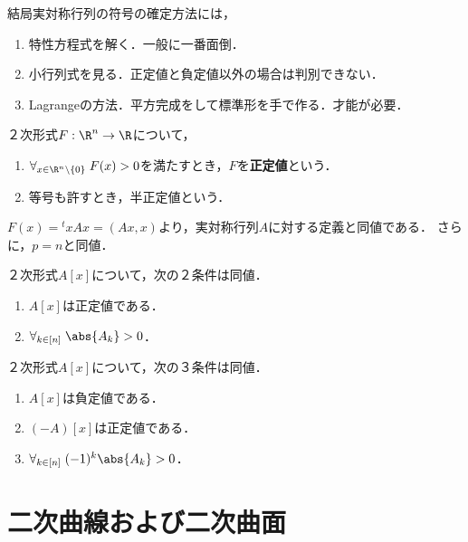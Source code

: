 \documentclass[uplatex, dvipdfmx]{jsreport}
\begin{document}
\begin{tcolorbox}[colframe=ForestGreen, colback=ForestGreen!10!white,breakable,colbacktitle=ForestGreen!40!white,coltitle=black,fonttitle=\bfseries\sffamily,
title=]
    結局実対称行列の符号の確定方法には，
    \begin{enumerate}
        \item 特性方程式を解く．一般に一番面倒．
        \item 小行列式を見る．正定値と負定値以外の場合は判別できない．
        \item Lagrangeの方法．平方完成をして標準形を手で作る．才能が必要．
    \end{enumerate}
\end{tcolorbox}

\begin{definition}
    ２次形式$F:\R^n\to\R$について，
    \begin{enumerate}
        \item $\forall_{x\in\R^n\setminus\{0\}}\;F(x)>0$を満たすとき，$F$を\textbf{正定値}という．
        \item 等号も許すとき，半正定値という．
    \end{enumerate}
    $F(x)={}^t\!xAx=(Ax,x)$より，実対称行列$A$に対する定義と同値である．
    さらに，$p=n$と同値．
\end{definition}

\begin{theorem}[小行列式による正値性判定法]
    ２次形式$A[x]$について，次の２条件は同値．
    \begin{enumerate}
        \item $A[x]$は正定値である．
        \item $\forall_{k\in[n]}\;\abs{A_k}>0$．
    \end{enumerate}
\end{theorem}

\begin{corollary}
    ２次形式$A[x]$について，次の３条件は同値．
    \begin{enumerate}
        \item $A[x]$は負定値である．
        \item $(-A)[x]$は正定値である．
        \item $\forall_{k\in[n]}\;(-1)^k\abs{A_k}>0$．
    \end{enumerate}
\end{corollary}

\section{二次曲線および二次曲面}
\end{document}
